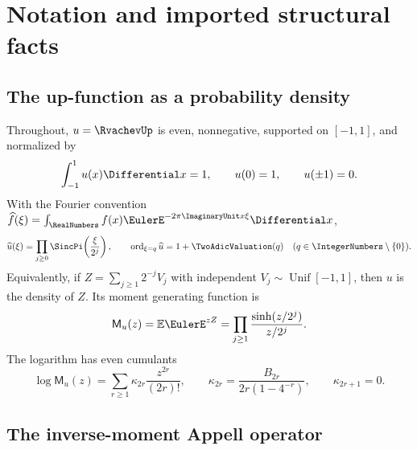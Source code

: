 \documentclass[11pt,oneside]{article}
\numberwithin{equation}{section}
\theoremstyle{definition}
\theoremstyle{remark}
\newcommand{\MGF}{\mathsf M}
\begin{document}
\section{Notation and imported structural facts}
\label{sec:prelim}

\subsection{The up-function as a probability density}

Throughout, $u=\RvachevUp$ is even, nonnegative, supported on $[-1,1]$, and
normalized by
\begin{equation}
 \int_{-1}^{1}u(x)\Differential x=1,
 \qquad u(0)=1,
 \qquad u(\pm1)=0.
 \label{eq:up-normalization}
\end{equation}
With the Fourier convention
$\widehat f(\xi)=\int_{\RealNumbers}f(x)\EulerE^{-2\pi\ImaginaryUnit x\xi}\Differential x$,
\begin{equation}
 \widehat u(\xi)=\prod_{j\ge0}\SincPi\!\left(\frac{\xi}{2^j}\right),
 \qquad
 \operatorname{ord}_{\xi=q}\widehat u=1+\TwoAdicValuation(q)
 \quad(q\in\IntegerNumbers\setminus\{0\}).
 \label{eq:fourier-product}
\end{equation}
Equivalently, if
$Z=\sum_{j\ge1}2^{-j}V_j$ with independent
$V_j\sim\operatorname{Unif}[-1,1]$, then $u$ is the density of $Z$.
Its moment generating function is
\begin{equation}
 \MGF_u(z)=\mathbb E\EulerE^{zZ}
 =\prod_{j\ge1}\frac{\sinh(z/2^j)}{z/2^j}.
 \label{eq:mgf}
\end{equation}
The logarithm has even cumulants
\begin{equation}
 \log\MGF_u(z)=\sum_{r\ge1}\kappa_{2r}\frac{z^{2r}}{(2r)!},
 \qquad
 \kappa_{2r}=\frac{B_{2r}}{2r(1-4^{-r})},
 \qquad \kappa_{2r+1}=0.
 \label{eq:cumulants}
\end{equation}

\subsection{The inverse-moment Appell operator}
\end{document}
